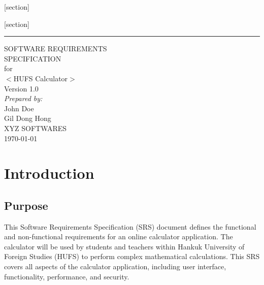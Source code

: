 \documentclass{scrreprt}
\date{}
\def\myversion{1.0 }
\begin{document}
[section] %
\newcommand{\usecaseid}{\stepcounter{usecaseid}UC\thesection.\theusecaseid}


[section] %
\newcommand{\freqid}{\stepcounter{freqid}FREQ\thesection.\thefreqid. }



\begin{flushright}
    \rule{16cm}{5pt}\vskip1cm
    \begin{bfseries}
        \Huge{SOFTWARE REQUIREMENTS\\ SPECIFICATION}\\
        \vspace{1cm}
        for\\
        \vspace{1cm}
        $<$HUFS Calculator$>$\\
        \vspace{1cm}
        \LARGE{Version \myversion}\\
        \vspace*{\fill}
        \textit{Prepared by:}\\
            John Doe\\
            Gil Dong Hong\\
        \vspace{1cm}
        XYZ SOFTWARES\\
        \vspace{1cm}
        \today\\
    \end{bfseries}
\end{flushright}

\tableofcontents


\chapter{Introduction}

\section{Purpose}
This Software Requirements Specification (SRS) document defines the functional and non-functional requirements for an online calculator application. The calculator will be used by students and teachers within Hankuk University of Foreign Studies (HUFS) to perform complex mathematical calculations. This SRS covers all aspects of the calculator application, including user interface, functionality, performance, and security.
\end{document}
